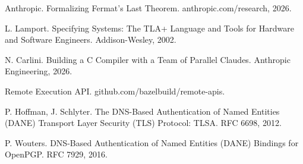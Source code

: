 \documentclass[11pt,a4paper]{article}
\begin{document}
\begin{english}
\begin{enumerate}[label={[\arabic*]},leftmargin=2.6em,itemsep=2pt]
\item Anthropic. Formalizing Fermat's Last Theorem. anthropic.com/research, 2026.
\item L. Lamport. Specifying Systems: The TLA+ Language and Tools for Hardware and Software Engineers. Addison-Wesley, 2002.
\item N. Carlini. Building a C Compiler with a Team of Parallel Claudes. Anthropic Engineering, 2026.
\item Remote Execution API. github.com/bazelbuild/remote-apis.
\item P. Hoffman, J. Schlyter. The DNS-Based Authentication of Named Entities (DANE) Transport Layer Security (TLS) Protocol: TLSA. RFC 6698, 2012.
\item P. Wouters. DNS-Based Authentication of Named Entities (DANE) Bindings for OpenPGP. RFC 7929, 2016.
\end{enumerate}
\end{english}
\end{document}
